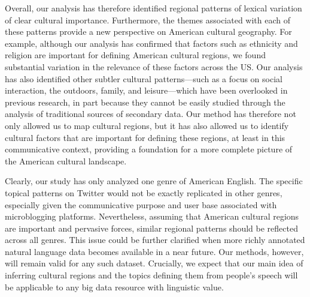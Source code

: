\documentclass[../thesis.tex]{subfiles}
\begin{document}
Overall, our analysis has therefore identified regional patterns of lexical variation of
clear cultural importance. Furthermore, the themes associated with each of these
patterns provide a new perspective on American cultural geography. For example, although
our analysis has confirmed that factors such as ethnicity and religion are important for
defining American cultural regions, we found substantial variation in the relevance of
these factors across the US. Our analysis has also identified other subtler cultural
patterns---such as a focus on social interaction, the outdoors, family, and
leisure---which have been overlooked in previous research, in part because they cannot
be easily studied through the analysis of traditional sources of secondary data. Our
method has therefore not only allowed us to map cultural regions, but it has also
allowed us to identify cultural factors that are important for defining these regions,
at least in this communicative context, providing a foundation for a more complete
picture of the American cultural landscape.

Clearly, our study has only analyzed one genre of American English. The specific topical
patterns on Twitter would not be exactly replicated in other genres, especially given
the communicative purpose and user base associated with microblogging platforms.
Nevertheless, assuming that American cultural regions are important and pervasive
forces, similar regional patterns should be reflected across all genres. This issue
could be further clarified when more richly annotated natural language data becomes
available in a near future. Our methods, however, will remain valid for any such
dataset. Crucially, we expect that our main idea of inferring cultural regions and the
topics defining them from people's speech will be applicable to any big data resource
with linguistic value.
\end{document}
